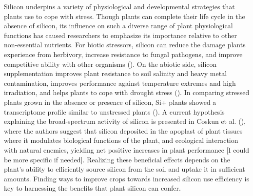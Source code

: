 \documentclass[12pt, letterpaper, ]{report}
\begin{document}
Silicon underpins a variety of physiological and developmental strategies that plants use to cope with stress. Though plants can complete their life cycle in the absence of silicon, its influence on such a diverse range of plant physiological functions has caused researchers to emphasize its importance relative to other non-essential nutrients.  For biotic stressors, silicon can reduce the damage plants experience from herbivory, increase resistance to fungal pathogens, and improve competitive ability with other organisms (\cite{fauteux_silicon_2005, katz_silicon_2019}). On the abiotic side, silicon supplementation improves plant resistance to soil salinity and heavy metal contamination, improves performance against temperature extremes and high irradiation, and helps plants to cope with drought stress (\cite{cooke_consistent_2016}). In comparing stressed plants grown in the absence or presence of silicon, Si+ plants showed a transcriptome profile similar to unstressed plants (\cite{coskun_controversies_2019}). A current hypothesis explaining the broad-spectrum activity of silicon is presented in Coskun et al. (\citeyear{coskun_controversies_2019}), where the authors suggest that silicon deposited in the apoplast of plant tissues where it modulates biological functions of the plant, and ecological interaction with natural enemies, yielding net positive increases in plant performance [I could be more specific if needed]. Realizing these beneficial effects depends on the plant’s ability to efficiently source silicon from the soil and uptake it in sufficient amounts. Finding ways to improve crops towards increased silicon use efficiency is key to harnessing the benefits that plant silicon can confer. 
\end{document}
